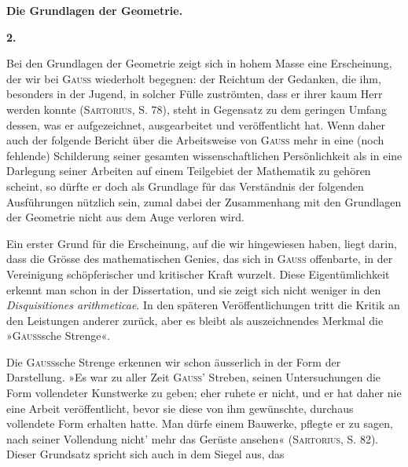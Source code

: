 \clearpage\begingroup{}
\renewcommand{\thefootnote}{\arabic{footnote})}
\begin{center}
\par\medskip
\textbf{Die Grundlagen der Geometrie.}\par\medskip
\textbf{2.}\par\medskip
{}
\end{center}
\noindent\hspace*{\parindent}Bei den Grundlagen der Geometrie zeigt sich in hohem Masse eine Erscheinung,
der wir bei \textsc{Gauss} wiederholt begegnen: der Reichtum der Gedanken,
die ihm, besonders in der Jugend, in solcher Fülle zuströmten, dass er ihrer
kaum Herr werden konnte (\textsc{Sartorius}, S. 78), steht in Gegensatz zu dem geringen
Umfang dessen, was er aufgezeichnet, ausgearbeitet und veröffentlicht
hat. Wenn daher auch der folgende Bericht über die Arbeitsweise von \textsc{Gauss}
mehr in eine (noch fehlende) Schilderung seiner gesamten wissenschaftlichen
Persönlichkeit als in eine Darlegung seiner Arbeiten auf einem Teilgebiet der
Mathematik zu gehören scheint, so dürfte er doch als Grundlage für das Verständnis
der folgenden Ausführungen nützlich sein, zumal dabei der Zusammenhang
mit den Grundlagen der Geometrie nicht aus dem Auge verloren wird.
\par
Ein erster Grund für die Erscheinung, auf die wir hingewiesen haben,
liegt darin, dass die Grösse des mathematischen Genies, das sich in \textsc{Gauss}
offenbarte, in der Vereinigung schöpferischer und kritischer Kraft wurzelt.
Diese Eigentümlichkeit erkennt man schon in der Dissertation, und sie zeigt
sich nicht weniger in den \textit{Disquisitiones arithmeticae}. In den späteren Veröffentlichungen
tritt die Kritik an den Leistungen anderer zurück, aber es bleibt
als auszeichnendes Merkmal die »\textsc{Gauss}sche Strenge«.
\par
Die \textsc{Gauss}sche Strenge erkennen wir schon äusserlich in der Form der
Darstellung. »Es war zu aller Zeit \textsc{Gauss}' Streben, seinen Untersuchungen
die Form vollendeter Kunstwerke zu geben; eher ruhete er nicht, und er hat
daher nie eine Arbeit veröffentlicht, bevor sie diese von ihm gewünschte,
durchaus vollendete Form erhalten hatte. Man dürfe einem Bauwerke, pflegte
er zu sagen, nach seiner Vollendung nicht’ mehr das Gerüste ansehen« (\textsc{Sartorius},
S. 82). Dieser Grundsatz spricht sich auch in dem Siegel aus, das
